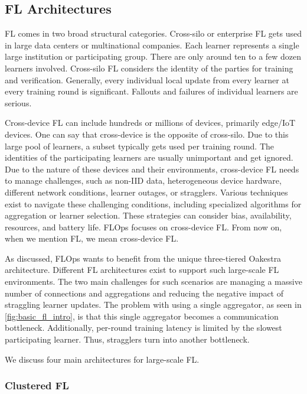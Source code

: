 \subsection{FL Architectures}

FL comes in two broad structural categories.
Cross-silo or enterprise FL gets used in large data centers or multinational companies.
Each learner represents a single large institution or participating group.
There are only around ten to a few dozen learners involved.
Cross-silo FL considers the identity of the parties for training and verification.
Generally, every individual local update from every learner at every training round is significant.
Fallouts and failures of individual learners are serious.

Cross-device FL can include hundreds or millions of devices, primarily edge/IoT devices.
One can say that cross-device is the opposite of cross-silo.
Due to this large pool of learners, a subset typically gets used per training round.
The identities of the participating learners are usually unimportant and get ignored.
Due to the nature of these devices and their environments, cross-device FL
needs to manage challenges, such as non-IID data, heterogeneous device hardware,
different network conditions, learner outages, or stragglers.
Various techniques exist to navigate these challenging conditions,
including specialized algorithms for aggregation or learner selection.
These strategies can consider bias, availability, resources, and battery life.
FLOps focuses on cross-device FL.
From now on, when we mention FL, we mean cross-device FL.

As discussed, FLOps wants to benefit from the unique three-tiered Oakestra \cite{paper:oakestra_usenix} architecture.
Different FL architectures exist to support such large-scale FL environments.
The two main challenges for such scenarios are managing a massive number of connections and aggregations
and reducing the negative impact of straggling learner updates.
The problem with using a single aggregator, as seen in \ref{fig:basic_fl_intro}, is
that this single aggregator becomes a communication bottleneck.
Additionally, per-round training latency is limited by the slowest participating learner.
Thus, stragglers turn into another bottleneck.

We discuss four main architectures for large-scale FL.

\subsubsection{Clustered FL}


